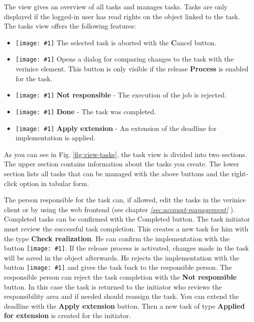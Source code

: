 \documentclass[a4paper,10pt]{book}
\newcommand{\icon}[1]{\texttt{[image: \#1]}}
\begin{document}
The view gives an overview of all tasks and manages tasks. Tasks are
only displayed if the logged-in user has read rights on the object
linked to the task.  The tasks view offers the following
features:
\begin{itemize}
  \item \icon{Icon/Nein.png} The selected task is aborted with the {\textbf Cancel} button.
  \item \icon{Icon/history_rep.png} Opens a
    dialog for comparing changes to the task with the verinice
    element. This button is only visible if the release
    \textbf{Process} is enabled for the task.
  \item \icon{Icon/16-em-check.png} \textbf{Not
      responsible} - The execution of the job is rejected.
  \item \icon{Icon/16-em-check.png} \textbf{Done}
    - The task was completed.
  \item \icon{Icon/16-em-check.png} \textbf{Apply
      extension} - An extension of the deadline for implementation is
    applied.
\end{itemize}
As you can see in Fig. \ref{fig:view-tasks}, the task view is divided
into two sections. The upper section contains information about the
tasks you create. The lower section lists all tasks that can be
managed with the above buttons and the right-click option in tabular
form.

The person responsible for the task can, if allowed, edit the tasks in the verinice client or by using the web frontend
(see chapter {\em \ref{sec:account-management} }). Completed tasks can be confirmed with the Completed button. The task initiator must review the successful task completion.
This creates a new task for him with the type \textbf{Check realization}. He can confirm the implementation with the button \icon{Icon/Akzeptieren-en.png}. If the release process is activated, changes made in the task will be saved in the object afterwards.
He rejects the implementation with the button \icon{Icon/Reject.png} and gives the task back to the responsible person.
The responsible person can reject the task completion with the \textbf{Not responsible} button. In this case the task is returned to the initiator who reviews the responsibility area and if
needed should reassign the task. You can extend the deadline with the \textbf{Apply extension} button. Then a new task of type \textbf{Applied for extension} is created for the initiator.
\end{document}

